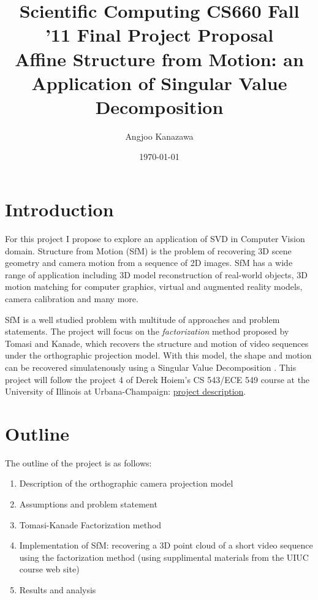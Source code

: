 \documentclass[a4paper]{article}
\begin{document}
\title{Scientific Computing CS660 Fall '11 Final Project Proposal\\ Affine Structure from Motion: an Application of Singular Value Decomposition}
\author{Angjoo Kanazawa}
\date{\today}
\maketitle

\section{Introduction}
For this project I propose to explore an application of SVD in Computer
Vision domain. Structure from Motion (SfM) is the problem of
recovering 3D scene geometry and camera motion from a sequence of 2D
images. SfM has a wide range of application including 3D model
reconstruction of real-world objects, 3D motion matching for computer
graphics, virtual and augmented reality models, camera calibration and
many more.


SfM is a well studied problem with multitude of
approaches and problem statements. The project will focus on the
\emph{factorization} method proposed by Tomasi and Kanade, which recovers the structure and motion of
video sequences under the orthographic projection model. With this
model, the shape and motion can be recovered simulatenously using a
Singular Value Decomposition \cite{Tomasi}. This project will follow the project 4 of Derek Hoiem's CS 543/ECE 549
course at the University of Illinois at Urbana-Champaign:
\href{http://www.cs.illinois.edu/class/sp11/cs543/hw/hw4.pdf}{project
  description}. 


\section{Outline}
The outline of the project is as follows:
\begin{enumerate}
\item Description of the orthographic camera projection model
\item Assumptions and problem statement
\item Tomasi-Kanade Factorization method
\item Implementation of SfM: recovering a 3D point cloud of a short
  video sequence using the factorization method (using supplimental materials from the UIUC course web site)
\item Results and analysis
\end{enumerate}
\end{document}
